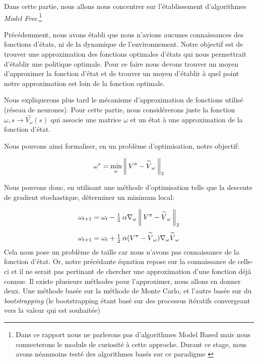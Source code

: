 Dans cette partie, nous allons nous concentrer sur l'établissement d'algorithmes \emph{Model Free}.\footnote{Dans ce rapport nous ne parlerons pas d'algorithmes Model Based mais nous connecterons le module de curiosité à cette approche. Durant ce stage, nous avons néanmoins testé des algorithmes basés sur ce paradigme \cite{VIME}}


Précédemment, nous avons établi que nous n'avions aucunes connaissances des fonctions d'états, ni de la dynamique de l'environnement. Notre objectif est de trouver une approximation des fonctions optimales d'états qui nous permettrait d'établir une politique optimale. Pour ce faire nous devons trouver un moyen d'approximer la fonction d'état et de trouver un moyen d'établir à quel point notre approximation est loin de la fonction optimale.

Nous expliquerons plus tard le mécanisme d'approximation de fonctions utilisé (réseau de neurones). Pour cette partie, nous considérerons juste la fonction $\omega, s \rightarrow \overset{\sim}{V_\omega}(s)$ qui associe une matrice $\omega$ et un état à une approximation de la fonction d'état. 

Nous pouvons ainsi formaliser, en un problème d'optimisation, notre objectif:

$$ \omega^* = \underset{\omega}{\min} \left\lVert\: {V^\pi - \overset{\sim}{V}_\omega} \:\right\rVert_2$$

Nous pouvons donc, en utilisant une méthode d'optimisation telle que la descente de gradient stochastique, déterminer un minimum local:

\begin{equation}
\begin{aligned}
\omega_{t+1} = \omega_t - \tfrac{1}{2} \: \alpha \nabla_\omega \norm{{V^\pi - \overset{\sim}{V}_\omega}}_2 \\[0.75ex]
\omega_{t+1} = \omega_t + \tfrac{1}{2} \: \alpha (V^\pi - \overset{\sim}{V}_\omega)\nabla_\omega \overset{\sim}{V}_\omega

\end{aligned}
\end{equation}
Cela nous pose un problème de taille car nous n'avons pas connaissance de la fonction d'état. Or, notre précédante équation repose sur la connaissance de celle-ci et il ne serait pas pertinant de chercher une approximation d'une fonction déjà connue. Il existe plusieurs méthodes pour l'approximer, nous allons en donner deux. Une méthode basée sur la méthode de Monte Carlo, et l'autre basée sur du \emph{bootstrapping} (le bootstrapping étant basé sur des processus itératifs convergeant vers la valeur qui est souhaitée)

